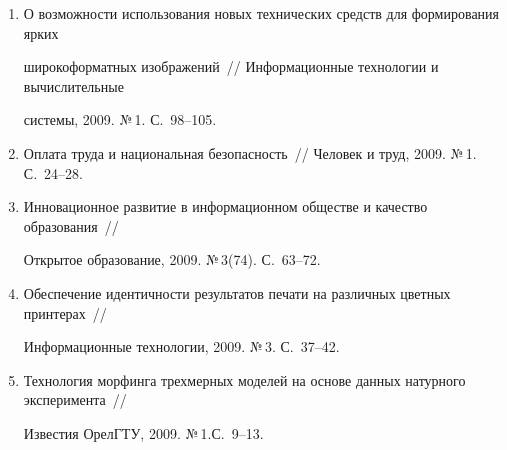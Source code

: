 \begin{enumerate}[1.]
\item {}


О возможности использования новых технических средств для формирования ярких 


широкоформатных изображений~// Информационные технологии и вы\-чис\-ли\-тель\-ные 


системы, 2009. №\,1. С.~98--105.
















\item {}


Оплата труда и национальная безопасность~// Человек и труд, 2009. №\,1. С.~24--28.





\item {}


Инновационное развитие в информационном обществе и качество образования~// 


Открытое образование, 2009. №\,3(74). С.~63--72.





\item {}


Обеспечение идентичности результатов печати на различных цветных принтерах~// 


Информационные технологии, 2009. №\,3. С.~37--42.





\item {}


Технология морфинга трехмерных моделей на основе данных натурного эксперимента~// 


Известия ОрелГТУ, 2009. №\,1.\linebreak С.~9--13.






\end{enumerate}
